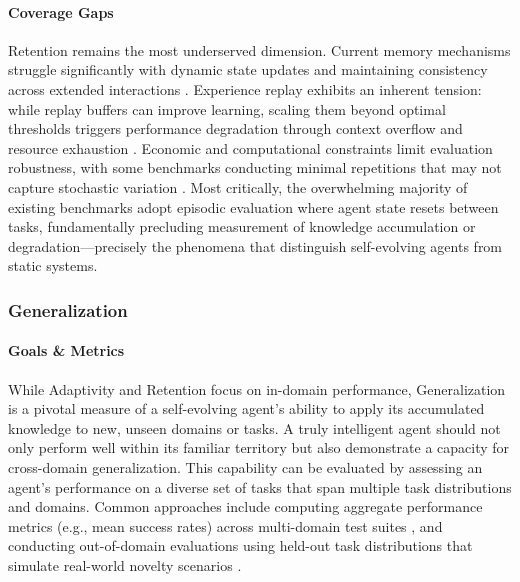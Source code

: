 \paragraph{Coverage Gaps} Retention remains the most underserved dimension. Current memory mechanisms struggle significantly with dynamic state updates and maintaining consistency across extended interactions \citep{hu2025evaluating}. Experience replay exhibits an inherent tension: while replay buffers can improve learning, scaling them beyond optimal thresholds triggers performance degradation through context overflow and resource exhaustion \citep{zheng2025lifelongagentbench}. Economic and computational constraints limit evaluation robustness, with some benchmarks conducting minimal repetitions that may not capture stochastic variation \citep{castillo-bolado2024beyond}. Most critically, the overwhelming majority of existing benchmarks adopt episodic evaluation where agent state resets between tasks, fundamentally precluding measurement of knowledge accumulation or degradation—precisely the phenomena that distinguish self-evolving agents from static systems.

\subsubsection{Generalization}
\paragraph{Goals \& Metrics}
While Adaptivity and Retention focus on in-domain performance, Generalization is a pivotal measure of a self-evolving agent’s ability to apply its accumulated knowledge to new, unseen domains or tasks. A truly intelligent agent should not only perform well within its familiar territory but also demonstrate a capacity for cross-domain generalization. This capability can be evaluated by assessing an agent’s performance on a diverse set of tasks that span multiple task distributions and domains. Common approaches include computing aggregate performance metrics (e.g., mean success rates) across multi-domain test suites \citep{liu2023agentbench, sun2023adaplanner}, and conducting out-of-domain evaluations using held-out task distributions that simulate real-world novelty scenarios \citep{hu2024agentgen, peng2025dlpo}.


